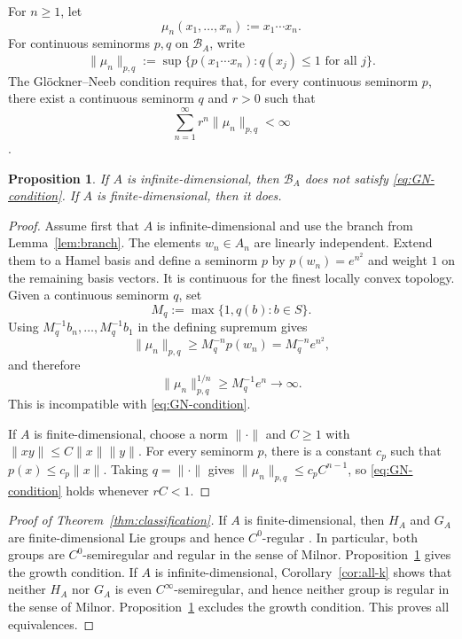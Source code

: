 \documentclass[11pt]{article}
\newtheorem{proposition}[theorem]{Proposition}
\theoremstyle{remark}
\begin{document}
For $n\geq1$, let
\[
  \mu_n(x_1,\ldots,x_n):=x_1\cdots x_n.
\]
For continuous seminorms $p,q$ on $\mathcal B_A$, write
\[
  \|\mu_n\|_{p,q}
  :=\sup\{p(x_1\cdots x_n):q(x_j)\leq1\text{ for all }j\}.
\]
The Gl\"ockner--Neeb condition requires that, for every continuous seminorm
$p$, there exist a continuous seminorm $q$ and $r>0$ such that
\begin{equation}
  \sum_{n=1}^\infty r^n\|\mu_n\|_{p,q}<\infty
  \label{eq:GN-condition}
\end{equation}
\cite[p.~96]{GlocknerNeebCIA}.

\begin{proposition}
\label{prop:growth}
If $A$ is infinite-dimensional, then $\mathcal B_A$ does not satisfy
\eqref{eq:GN-condition}.  If $A$ is finite-dimensional, then it does.
\end{proposition}

\begin{proof}
Assume first that $A$ is infinite-dimensional and use the branch from
Lemma~\ref{lem:branch}.  The elements $w_n\in A_n$ are linearly independent.
Extend them to a Hamel basis and define a seminorm $p$ by
$p(w_n)=e^{n^2}$ and weight $1$ on the remaining basis vectors.  It is
continuous for the finest locally convex topology.  Given a continuous
seminorm $q$, set
\[
  M_q:=\max\{1,q(b):b\in S\}.
\]
Using $M_q^{-1}b_n,\ldots,M_q^{-1}b_1$ in the defining supremum gives
\[
  \|\mu_n\|_{p,q}
  \geq M_q^{-n}p(w_n)
  =M_q^{-n}e^{n^2},
\]
and therefore
\[
  \|\mu_n\|_{p,q}^{1/n}\geq M_q^{-1}e^n\longrightarrow\infty.
\]
This is incompatible with \eqref{eq:GN-condition}.

If $A$ is finite-dimensional, choose a norm $\|\cdot\|$ and $C\geq1$ with
$\|xy\|\leq C\|x\|\|y\|$.  For every seminorm $p$, there is a constant
$c_p$ such that $p(x)\leq c_p\|x\|$.  Taking $q=\|\cdot\|$ gives
$\|\mu_n\|_{p,q}\leq c_pC^{n-1}$, so
\eqref{eq:GN-condition} holds whenever $rC<1$.
\end{proof}

\begin{proof}[Proof of Theorem~\ref{thm:classification}]
If $A$ is finite-dimensional, then $H_A$ and $G_A$ are finite-dimensional
Lie groups and hence $C^0$-regular
\cite[Theorem~6.3.4]{GlocknerNeebBook2026}.  In particular, both groups are
$C^0$-semiregular and regular in the sense of Milnor.
Proposition~\ref{prop:growth} gives the growth condition.  If $A$ is infinite-dimensional,
Corollary~\ref{cor:all-k} shows that neither $H_A$ nor $G_A$ is even
$C^\infty$-semiregular, and hence neither group is regular in the sense of
Milnor.  Proposition~\ref{prop:growth} excludes the growth condition.  This
proves all equivalences.
\end{proof}
\end{document}
